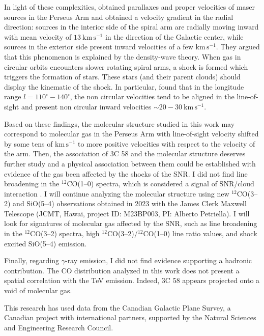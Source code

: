 \documentclass[baaa]{baaa}
\begin{document}
In light of these complexities, \cite{sakai19} obtained parallaxes and proper velocities of maser sources in the Perseus Arm and obtained a velocity gradient in the radial direction: sources in the interior side of the spiral arm are radially moving inward with mean velocity of $13~\mathrm{km\,s^{-1}}$ in the direction of the Galactic center, while sources in the exterior side present inward velocities of a few $\mathrm{km\,s^{-1}}$. They argued that this phenomenon is explained by the density-wave theory. When gas in circular orbits encounters slower rotating spiral arms, a shock is formed which triggers the formation of stars. These stars (and their parent clouds) should display the kinematic of the shock. In particular, \cite{sakai19} found that in the longitude range $l = 110^{\circ}-140^{\circ}$, the non circular velocities tend to be aligned in the line-of-sight and present non circular inward velocities $\sim 20-30~\mathrm{km\,s^{-1}}$. 

Based on these findings, the molecular structure studied in this work may correspond to molecular gas in the Perseus Arm with line-of-sight velocity shifted by some tens of $\mathrm{km\,s^{-1}}$ to more positive velocities with respect to the velocity of the arm. 
Then, the association of 3C 58 and the molecular structure deserves further study and a physical association between them could be established with evidence of the gas been affected by the shocks of the SNR.
I did not find line broadening in the $^{12}$CO(1--0) spectra, which is considered a signal of SNR/cloud interaction \citep{kilpa16}.
I will continue analyzing the molecular structure using new $^{12}$CO(3--2) and SiO(5--4) observations obtained in 2023 with the James Clerk Maxwell Telescope (JCMT, Hawai, project ID: M23BP003, PI: Alberto Petriella). I will look for signatures of molecular gas affected by the SNR, such as line broadening in the $^{12}$CO(3--2) spectra, high $^{12}$CO(3--2)/$^{12}$CO(1--0) line ratio values, and shock excited SiO(5--4) emission.

Finally, regarding $\gamma$-ray emission, I did not find evidence supporting a hadronic contribution. The CO distribution analyzed in this work does not present a spatial correlation with the TeV emission. Indeed, 3C 58 appears projected onto a void of molecular gas.

\begin{acknowledgement}
This research has used data from the Canadian Galactic Plane Survey, a Canadian project with international partners, supported by the Natural Sciences and Engineering Research Council.
\end{acknowledgement}
\end{document}
